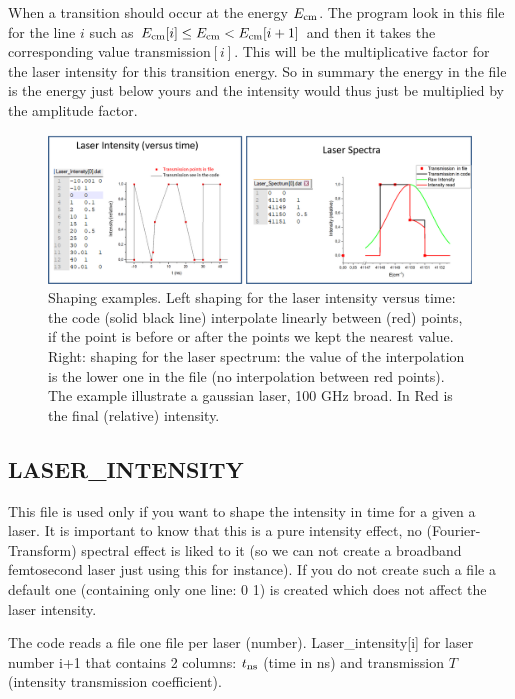 \documentclass[amsmath,amssymb,nofootinbib]{revtex4-2}
\begin{document}
When a transition should occur at the energy  $E_{\rm cm}$. 
The program look in this file for the line $i$ such as  $E_{\rm cm}[i] \leq E_{\rm cm} < E_{\rm cm}[i+1]$ and then it takes the corresponding value 
transmission$[i]$. This will be the multiplicative factor for the laser intensity for this transition energy.
So in summary the energy in the file is the energy just below yours and the intensity would thus just be multiplied by the amplitude factor.


\begin{figure}
	\centering
	\includegraphics[width=1\linewidth]{shaping}
	\caption{Shaping examples. Left  shaping for the laser intensity versus time: the code (solid black line) interpolate linearly between (red) points, if the point is before or after the points we kept the nearest value. Right: shaping for the laser spectrum: the value of the interpolation is the lower one in the file (no interpolation between red points). The example illustrate a gaussian laser, 100 GHz broad. In Red is the final (relative) intensity.}
	\label{fig:shaping}
\end{figure}



\subsection{LASER\_INTENSITY} 

This file is used only if you want to  shape the intensity in time for a given a laser. 
It is important to know that this is a pure intensity effect, no (Fourier-Transform) spectral effect is liked to it (so we can not create a broadband femtosecond laser just using this for instance).
 If you do not create such a file a default one (containing only one line: 0 1) is created which does not affect the laser intensity.


The code reads a file one file per laser (number).
Laser\_intensity[i] for laser number i+1
that contains 2 columns: $t_{\rm ns}$  (time in ns) and transmission $T$ (intensity transmission coefficient).
\end{document}
